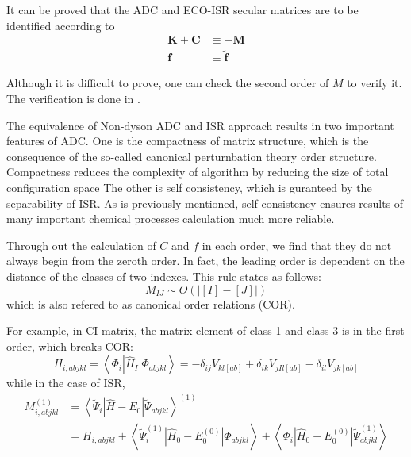 It can be proved that the ADC and ECO-ISR secular matrices are to be identified according to
\begin{equation}
	\begin{aligned} \boldsymbol{K}+\boldsymbol{C} & \equiv-\boldsymbol{M} \\ \boldsymbol{f} & \equiv \tilde{\boldsymbol{f}} \end{aligned}
\end{equation}

Although it is difficult to prove, one can check the second order of $M$ to verify it.
The verification is done in \cite{main}.

The equivalence of Non-dyson ADC and ISR approach results in two important features of ADC.
One is the compactness of matrix structure, which is the consequence of the so-called canonical perturnbation theory order structure.
Compactness reduces the complexity of algorithm by reducing the size of total configuration space
The other is self consistency, which is guranteed by the separability of ISR.
As is previously mentioned, self consistency ensures results of many important chemical processes calculation much more reliable.

Through out the calculation of $C$ and $f$ in each order, we find that they do not always begin from the zeroth order.
In fact, the leading order is dependent on the distance of the classes of two  indexes.
This rule states as follows:
\begin{equation}
	M_{I J} \sim O( | [I]-[J] | )
\end{equation}
which is also refered to as canonical order relations (COR).

For example, in CI matrix, the matrix element of class 1 and class 3 is in the first order, which breaks COR:
\begin{equation}
	H_{i, a b j k l}=\left\langle\Phi_{i}\left|\hat{H}_{I}\right| \Phi_{a b j k l}\right\rangle=-\delta_{i j} V_{k l[a b]}+\delta_{i k} V_{j I l[a b]}-\delta_{i l} V_{j k[a b]}
\end{equation}
while in the case of ISR,
\begin{equation}
	\begin{aligned} M_{i, a b j k l}^{(1)} &=\left\langle\tilde{\Psi}_{i}\left|\hat{H}-E_{0}\right| \tilde{\Psi}_{a b j k l}\right\rangle^{(1)} \\ &=H_{i, a b j k l}+\left\langle\tilde{\Psi}_{i}^{(1)}\left|\hat{H}_{0}-E_{0}^{(0)}\right| \Phi_{a b j k l}\right\rangle+\left\langle\Phi_{i}\left|\hat{H}_{0}-E_{0}^{(0)}\right| \tilde{\Psi}_{a b j k l}^{(1)}\right\rangle \end{aligned}
\end{equation}

